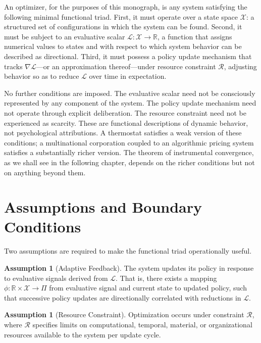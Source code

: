 \documentclass[12pt, oneside]{book}
\theoremstyle{plain}
\theoremstyle{definition}
\theoremstyle{remark}
\theoremstyle{definition}
\newtheorem{assumption}[theorem]{Assumption}
\begin{document}
An optimizer, for the purposes of this monograph, is any system satisfying the
following minimal functional triad. First, it must operate over a state space
$\mathcal{X}$: a structured set of configurations in which the system can be found.
Second, it must be subject to an evaluative scalar $\mathcal{L}: \mathcal{X} \to
\mathbb{R}$, a function that assigns numerical values to states and with respect to
which system behavior can be described as directional. Third, it must possess a
policy update mechanism that tracks $\nabla \mathcal{L}$---or an approximation
thereof---under resource constraint $\mathcal{R}$, adjusting behavior so as to
reduce $\mathcal{L}$ over time in expectation.

No further conditions are imposed. The evaluative scalar need not be consciously
represented by any component of the system. The policy update mechanism need not
operate through explicit deliberation. The resource constraint need not be
experienced as scarcity. These are functional descriptions of dynamic behavior, not
psychological attributions. A thermostat satisfies a weak version of these conditions;
a multinational corporation coupled to an algorithmic pricing system satisfies a
substantially richer version. The theorem of instrumental convergence, as we shall
see in the following chapter, depends on the richer conditions but not on anything
beyond them.

\section{Assumptions and Boundary Conditions}

Two assumptions are required to make the functional triad operationally useful.

\begin{assumption}[Adaptive Feedback]
\label{ass:feedback}
The system updates its policy in response to evaluative signals derived from
$\mathcal{L}$. That is, there exists a mapping $\phi: \mathbb{R} \times \mathcal{X}
\to \Pi$ from evaluative signal and current state to updated policy, such that
successive policy updates are directionally correlated with reductions in $\mathcal{L}$.
\end{assumption}

\begin{assumption}[Resource Constraint]
\label{ass:resource}
Optimization occurs under constraint $\mathcal{R}$, where $\mathcal{R}$ specifies
limits on computational, temporal, material, or organizational resources available
to the system per update cycle.
\end{assumption}
\end{document}
